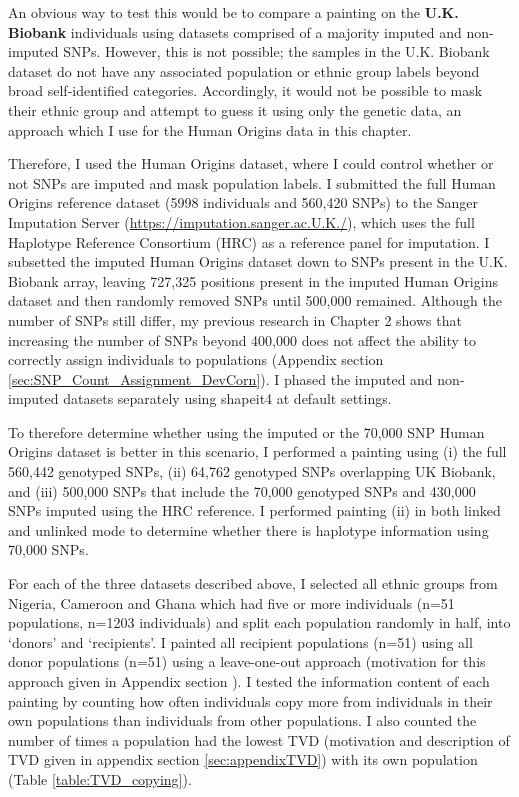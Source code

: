 An obvious way to test this would be to compare a painting on the \textbf{U.K. Biobank} individuals using datasets comprised of a majority imputed and non-imputed SNPs. However, this is not possible; the samples in the U.K. Biobank dataset do not have any associated population or ethnic group labels beyond broad self-identified categories. Accordingly, it would not be possible to mask their ethnic group and attempt to guess it using only the genetic data, an approach which I use for the Human Origins data in this chapter.

Therefore, I used the Human Origins dataset, where I could control whether or not SNPs are imputed and mask population labels. I submitted the full Human Origins reference dataset (5998 individuals and 560,420 SNPs) to the Sanger Imputation Server (\url{https://imputation.sanger.ac.U.K./}), which uses the full Haplotype Reference Consortium (HRC) as a reference panel for imputation. 
I subsetted the imputed Human Origins dataset down to SNPs present in the U.K. Biobank array, leaving 727,325 positions present in the imputed Human Origins dataset and then randomly removed SNPs until 500,000 remained. Although the number of SNPs still differ, my previous research in Chapter 2 shows that increasing the number of SNPs beyond 400,000 does not affect the ability to correctly assign individuals to populations (Appendix section \ref{sec:SNP_Count_Assignment_DevCorn}). I phased the imputed and non-imputed datasets separately using shapeit4 at default settings. 

To  therefore determine whether using the imputed or the 70,000 SNP Human Origins dataset is better in this scenario, I performed a painting using (i) the full 560,442 genotyped SNPs, (ii) 64,762 genotyped SNPs overlapping UK Biobank, and (iii) 500,000 SNPs that include the 70,000 genotyped SNPs and 430,000 SNPs imputed using the HRC reference. I performed painting (ii) in both linked and unlinked mode to determine whether there is haplotype information using 70,000 SNPs.

For each of the three datasets described above, I selected all ethnic groups from Nigeria, Cameroon and Ghana which had five or more individuals (n=51 populations, n=1203 individuals) and split each population randomly in half, into `donors' and `recipients'. I painted all recipient populations (n=51) using all donor populations (n=51) using a leave-one-out approach (motivation for this approach given in Appendix section \label{sec:leave_one_out}). I tested the information content of each painting by counting how often individuals copy more from individuals in their own populations than individuals from other populations. I also counted the number of times a population had the lowest TVD (motivation and description of TVD given in appendix section \ref{sec:appendixTVD}) with its own population (Table \ref{table:TVD_copying}).

